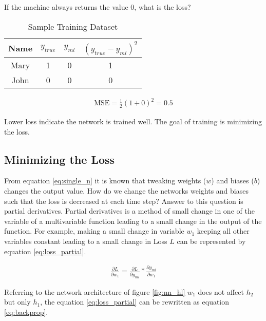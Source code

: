 If the machine always returns the value 0, what is the loss?

\begin{table}[h]
    \centering
    \caption{Sample Training Dataset}
    \label{table:Sample Training Dataset}
    \begin{tabular}{ cccc }
          \toprule
          
          \textbf{Name}& \textbf{$y_ {true}$} & \textbf{$y_ {ml}$}  & \textbf{$(y_ {true} - y_{ml})^2$}\\
          \midrule
          Mary&1 & 0 & 1\\
          John&0 & 0 & 0\\         
         
          \bottomrule
          \end{tabular}
\end{table}

\begin{align}
    \text{MSE} = \frac{1}{2} (1+0)^2 = 0.5
\end{align}

Lower loss indicate the network is trained well. The goal of training is minimizing the loss. 


\subsection*{Minimizing the Loss} \label{sec:minloss}

From equation \ref{eq:single_n} it is known that tweaking weights ($w$) and biases ($b$) changes the output value.  How do we change the networks weights and biases such that the loss is decreased at each time step? Answer to this question is partial derivatives. Partial derivatives is a method of small change in one of the variable of a multivariable function leading to a small change in the output of the function. For example, making a small change in variable $w_1$ keeping all other variables constant leading to a small change in Loss $L$ can be represented by equation \ref{eq:loss_partial}.

\begin{align}
    \frac{\partial L }{\partial w_1} = \frac{\partial L}{\partial y_{ml}} * \frac{\partial y_{ml}}{\partial w_1}
    \label{eq:loss_partial}
\end{align}

Referring to the network architecture of figure \ref{fig:nn_hl} $w_1$ does not affect $h_2$ but only $h_1$, the equation \ref{eq:loss_partial} can be rewritten as equation \ref{eq:backprop}.


